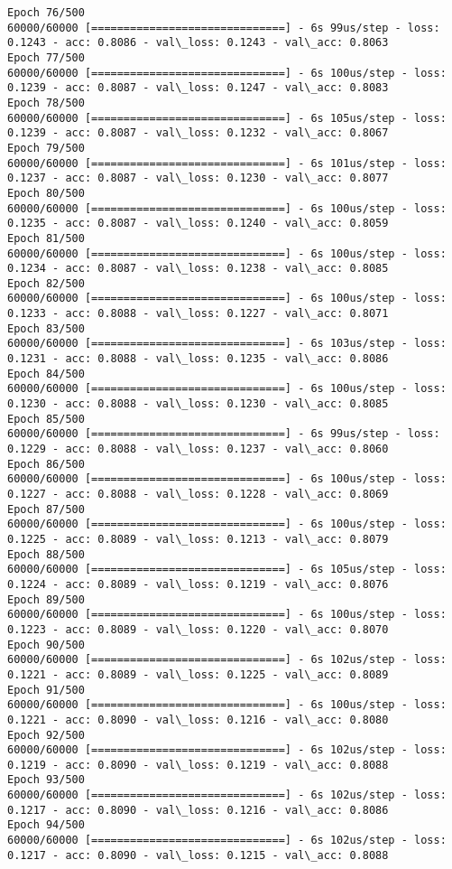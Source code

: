 \documentclass[11pt]{article}
\begin{document}
\begin{Verbatim}[commandchars=\\\{\}]
Epoch 76/500
60000/60000 [==============================] - 6s 99us/step - loss: 0.1243 - acc: 0.8086 - val\_loss: 0.1243 - val\_acc: 0.8063
Epoch 77/500
60000/60000 [==============================] - 6s 100us/step - loss: 0.1239 - acc: 0.8087 - val\_loss: 0.1247 - val\_acc: 0.8083
Epoch 78/500
60000/60000 [==============================] - 6s 105us/step - loss: 0.1239 - acc: 0.8087 - val\_loss: 0.1232 - val\_acc: 0.8067
Epoch 79/500
60000/60000 [==============================] - 6s 101us/step - loss: 0.1237 - acc: 0.8087 - val\_loss: 0.1230 - val\_acc: 0.8077
Epoch 80/500
60000/60000 [==============================] - 6s 100us/step - loss: 0.1235 - acc: 0.8087 - val\_loss: 0.1240 - val\_acc: 0.8059
Epoch 81/500
60000/60000 [==============================] - 6s 100us/step - loss: 0.1234 - acc: 0.8087 - val\_loss: 0.1238 - val\_acc: 0.8085
Epoch 82/500
60000/60000 [==============================] - 6s 100us/step - loss: 0.1233 - acc: 0.8088 - val\_loss: 0.1227 - val\_acc: 0.8071
Epoch 83/500
60000/60000 [==============================] - 6s 103us/step - loss: 0.1231 - acc: 0.8088 - val\_loss: 0.1235 - val\_acc: 0.8086
Epoch 84/500
60000/60000 [==============================] - 6s 100us/step - loss: 0.1230 - acc: 0.8088 - val\_loss: 0.1230 - val\_acc: 0.8085
Epoch 85/500
60000/60000 [==============================] - 6s 99us/step - loss: 0.1229 - acc: 0.8088 - val\_loss: 0.1237 - val\_acc: 0.8060
Epoch 86/500
60000/60000 [==============================] - 6s 100us/step - loss: 0.1227 - acc: 0.8088 - val\_loss: 0.1228 - val\_acc: 0.8069
Epoch 87/500
60000/60000 [==============================] - 6s 100us/step - loss: 0.1225 - acc: 0.8089 - val\_loss: 0.1213 - val\_acc: 0.8079
Epoch 88/500
60000/60000 [==============================] - 6s 105us/step - loss: 0.1224 - acc: 0.8089 - val\_loss: 0.1219 - val\_acc: 0.8076
Epoch 89/500
60000/60000 [==============================] - 6s 100us/step - loss: 0.1223 - acc: 0.8089 - val\_loss: 0.1220 - val\_acc: 0.8070
Epoch 90/500
60000/60000 [==============================] - 6s 102us/step - loss: 0.1221 - acc: 0.8089 - val\_loss: 0.1225 - val\_acc: 0.8089
Epoch 91/500
60000/60000 [==============================] - 6s 100us/step - loss: 0.1221 - acc: 0.8090 - val\_loss: 0.1216 - val\_acc: 0.8080
Epoch 92/500
60000/60000 [==============================] - 6s 102us/step - loss: 0.1219 - acc: 0.8090 - val\_loss: 0.1219 - val\_acc: 0.8088
Epoch 93/500
60000/60000 [==============================] - 6s 102us/step - loss: 0.1217 - acc: 0.8090 - val\_loss: 0.1216 - val\_acc: 0.8086
Epoch 94/500
60000/60000 [==============================] - 6s 102us/step - loss: 0.1217 - acc: 0.8090 - val\_loss: 0.1215 - val\_acc: 0.8088

\end{Verbatim}
\end{document}

